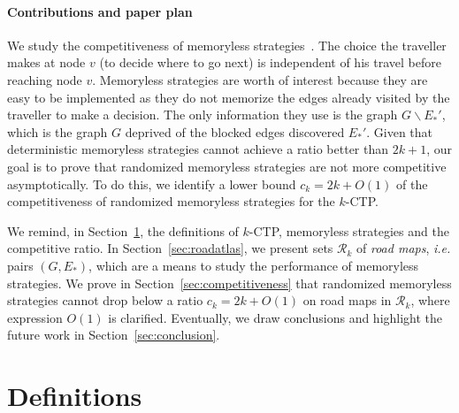 \documentclass[preprint]{elsarticle}
\newcommand{\kctp}{$k$-CTP}
\begin{document}
\paragraph{Contributions and paper plan}
We study the competitiveness of memoryless strategies~\cite{Al03,BoEl98}. The choice the traveller makes at node $v$ (to decide where to go next) is independent of his travel before reaching node $v$. Memoryless strategies are worth of interest because they are easy to be implemented as they do not memorize the edges already visited by the traveller to make a decision. The only information they use is the graph $G\backslash E_*'$, which is the graph $G$ deprived of the blocked edges discovered $E_*'$.
Given that deterministic memoryless strategies cannot achieve a ratio better than $2k+1$, our goal is to prove that randomized memoryless strategies are not more competitive asymptotically. To do this, we identify a lower bound $c_k = 2k + O\left(1\right)$ of the competitiveness of randomized memoryless strategies for the \kctp.

We remind, in Section~\ref{sec:def}, the definitions of \kctp , memoryless strategies and the competitive ratio.
In Section~\ref{sec:roadatlas}, we present sets $\mathcal{R}_k$ of \textit{road maps}, {\em i.e.} pairs $\left(G,E_*\right)$, which are a means to study the performance of memoryless strategies.
We prove in Section~\ref{sec:competitiveness} that randomized memoryless strategies cannot drop below a ratio $c_k = 2k+O\left(1\right)$ on road maps in $\mathcal{R}_k$, where expression $O\left(1\right)$ is clarified.
Eventually, we draw conclusions and highlight the future work in Section~\ref{sec:conclusion}.
\section{Definitions} \label{sec:def}
\end{document}
